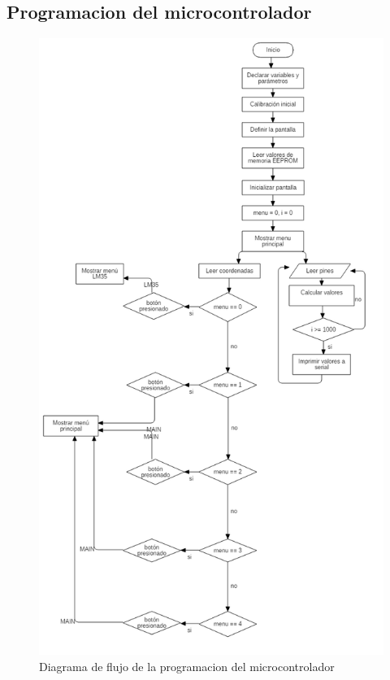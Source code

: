 \documentclass[conference]{IEEEtran}
\begin{document}
\subsection{Programacion del microcontrolador}
\begin{figure}
  \includegraphics[width=\linewidth]{fig1_diagram_Arduino.png}
  \caption{Diagrama de flujo de la programacion del microcontrolador}
  \label{fig:flowDiagram1}
\end{figure}
\end{document}
